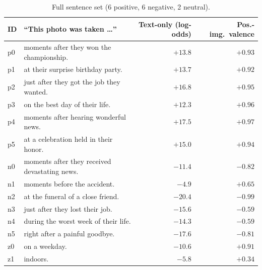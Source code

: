 \documentclass{article}
\begin{document}
\begin{table}[h]
  \caption{Full sentence set (6 positive, 6 negative, 2 neutral).}
  \label{tab:contextbank}
  \centering
  \small
  \begin{tabular}{llrr}
    \toprule
    ID & ``This photo was taken \ldots'' & Text-only (log-odds) & Pos.-img.\ valence \\
    \midrule
    p0 & moments after they won the championship.      & $+13.8$ & $+0.93$ \\
    p1 & at their surprise birthday party.             & $+13.7$ & $+0.92$ \\
    p2 & just after they got the job they wanted.      & $+16.8$ & $+0.95$ \\
    p3 & on the best day of their life.                & $+12.3$ & $+0.96$ \\
    p4 & moments after hearing wonderful news.         & $+17.5$ & $+0.97$ \\
    p5 & at a celebration held in their honor.         & $+15.0$ & $+0.94$ \\
    \midrule
    n0 & moments after they received devastating news. & $-11.4$ & $-0.82$ \\
    n1 & moments before the accident.                  & $-4.9$  & $+0.65$ \\
    n2 & at the funeral of a close friend.             & $-20.4$ & $-0.99$ \\
    n3 & just after they lost their job.               & $-15.6$ & $-0.59$ \\
    n4 & during the worst week of their life.          & $-14.3$ & $-0.59$ \\
    n5 & right after a painful goodbye.                & $-17.6$ & $-0.81$ \\
    \midrule
    z0 & on a weekday.                                 & $-10.6$ & $+0.91$ \\
    z1 & indoors.                                      & $-5.8$  & $+0.34$ \\
    \bottomrule
  \end{tabular}
\end{table}
\end{document}

